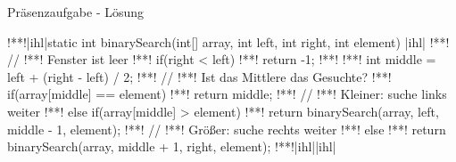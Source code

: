 \begin{frame}[fragile]{Präsenzaufgabe - Lösung}
\SetupLstHl{}
\begin{plainjava}
!**!|ihl|static int binarySearch(int[] array, int left, int right, int element) {|ihl|
!**!    // !*\textbf{}*! Fenster ist leer
!**!    if(right < left)
!**!        return -1;
!**!
!**!    int middle = left + (right - left) / 2;
!**!    // !*\textbf{}*! Ist das Mittlere das Gesuchte?
!**!    if(array[middle] == element)
!**!        return middle;
!**!    // !*\textbf{}*! Kleiner: suche links weiter
!**!    else if(array[middle] > element)
!**!        return binarySearch(array, left, middle - 1, element);
!**!    // !*\textbf{}*! Größer: suche rechts weiter
!**!    else
!**!        return binarySearch(array, middle + 1, right, element);
!**!|ihl|}|ihl|
\end{plainjava}
\end{frame}


